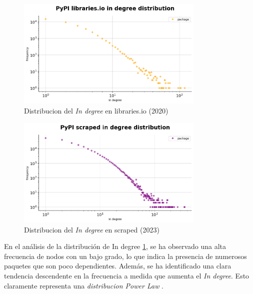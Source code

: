 \begin{figure}[ht!]
    \begin{center}
        \includegraphics[width=0.8\textwidth]{img/pypi/ind_libio_d.png}
        \caption{Distribucion del \textit{In degree} en libraries.io (2020)}
        \label{fig: Distribucion del In degree en libraries.io}
    \end{center}
\end{figure}

\begin{figure}[ht!]
    \begin{center}
        \includegraphics[width=0.8\textwidth]{img/pypi/ind_scraped_dist.png}
        \caption{Distribucion del \textit{In degree} en scraped (2023)}
        \label{fig: Distribucion del In degree en scraped}
    \end{center}
\end{figure}

En el análisis de la distribución de In degree \ref{fig: Distribucion del In degree en libraries.io},
se ha observado una alta frecuencia de nodos con un bajo grado,
lo que indica la presencia de numerosos paquetes que son poco dependientes. Además, se ha identificado
una clara tendencia descendente en la frecuencia a medida que aumenta el \textit{In degree}.
Esto claramente representa una \textit{distribucion Power Law} \cite{enwiki:1160892030}.

